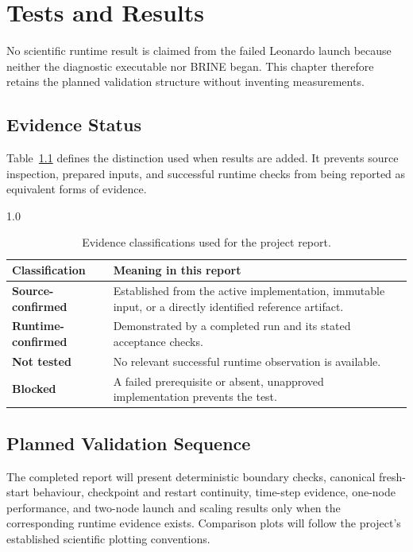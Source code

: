 \chapter{Tests and Results}
\label{ch:tests-and-results}

No scientific runtime result is claimed from the failed Leonardo launch because
neither the diagnostic executable nor BRINE began. This chapter therefore
retains the planned validation structure without inventing measurements.

\section{Evidence Status}

Table~\ref{tab:evidence-status} defines the distinction used when results are
added. It prevents source inspection, prepared inputs, and successful runtime
checks from being reported as equivalent forms of evidence.

\begin{table}[htbp]
  \centering
  \caption{Evidence classifications used for the project report.}
  \label{tab:evidence-status}
  \begin{spacing}{1.0}
  \small
  \begin{tabularx}{\textwidth}{@{}>{\bfseries}lX@{}}
    \toprule
    Classification & Meaning in this report \\
    \midrule
    Source-confirmed & Established from the active implementation, immutable
      input, or a directly identified reference artifact. \\
    Runtime-confirmed & Demonstrated by a completed run and its stated
      acceptance checks. \\
    Not tested & No relevant successful runtime observation is available. \\
    Blocked & A failed prerequisite or absent, unapproved implementation
      prevents the test. \\
    \bottomrule
  \end{tabularx}
  \end{spacing}
\end{table}

\section{Planned Validation Sequence}

The completed report will present deterministic boundary checks, canonical
fresh-start behaviour, checkpoint and restart continuity, time-step evidence,
one-node performance, and two-node launch and scaling results only when the
corresponding runtime evidence exists. Comparison plots will follow the
project's established scientific plotting conventions.

